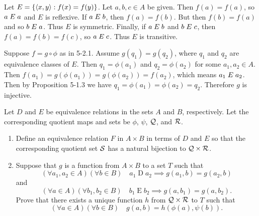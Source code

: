 \begin{solution}
Let $E=\left\{ \left\langle x,y\right\rangle : f(x)=f(y) \right\}$. Let $a,b,c\in A$ be given. Then $f(a)=f(a)$, so $a\mathrel{E} a$ and $E$
is reflexive.
If $a\mathrel{E} b$, then $f(a)=f(b)$. But then $f(b)=f(a)$ and so $b\mathrel{E} a$. Thus $E$ is symmetric.
Finally, if $a\mathrel{E} b$ and $b\mathrel{E} c$, then $f(a)=f(b)=f(c)$, so $a\mathrel{E} c$. Thus $E$ is transitive.

Suppose $f=g\circ \phi$ as in 5-2.1. Assume $g(q_1)=g(q_2)$, where $q_1$ and $q_2$ are equivalence
classes of $E$. Then $q_1=\phi(a_1)$ and $q_2=\phi(a_2)$ for some $a_1,a_2\in A$.
Then $f(a_1)=g(\phi(a_1))=g(\phi(a_2))=f(a_2)$, which means $a_1\mathrel{E} a_2$.
Then by Proposition 5-1.3 we have $q_1=\phi(a_1)=\phi(a_2)=q_2$. Therefore $g$ is injective.
\end{solution}

\begin{exercise}
Let $D$ and $E$ be equivalence relations in the sets $A$ and $B$, respectively.
Let the corresponding quotient maps and sets be $\phi$, $\psi$, $\mathcal{Q}$, and $\mathcal{R}$.
\begin{enumerate}[label=(\alph*)]
    \item Define an equivalence relation $F$ in $A\times B$ in terms of $D$ and $E$ so
        that the corresponding quotient set $\mathcal{S}$ has a natural bijection to $\mathcal{Q}\times\mathcal{R}$.
    \item Suppose that $g$ is a function from $A\times B$ to a set $T$ such that
        \[(\forall a_1,a_2\in A)(\forall b\in B)\quad a_1\mathrel{D} a_2\implies g(a_1,b)=g(a_2,b)\]
        and
        \[(\forall a\in A)(\forall b_1,b_2\in B)\quad b_1\mathrel E b_2\implies g(a,b_1)=g(a,b_2).\]
        Prove that there exists a unique function $h$ from $\mathcal{Q}\times \mathcal{R}$ to $T$ such that
        \[(\forall a\in A)(\forall b\in B)\quad g(a,b)=h(\phi(a),\psi(b)).\]
\end{enumerate}
\end{exercise}

